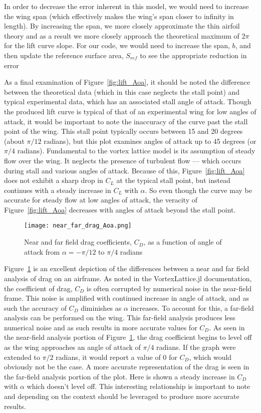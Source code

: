 \documentclass{article}
\begin{document}
In order to decrease the error inherent in this model, we would need to increase the wing span (which effectively makes the wing's span closer to infinity in length). By increasing the span, we more closely approximate the thin airfoil theory and as a result we more closely approach the theoretical maximum of $2\pi$ for the lift curve slope.
For our code, we would need to increase the span, $b$, and then update the reference surface area, $S_{ref}$ to see the appropriate reduction in error

As a final examination of Figure~\ref{fig:lift_Aoa}, it should be noted the difference between the theoretical data (which in this case neglects the stall point) and typical experimental data, which has an associated stall angle of attack.
Though the produced lift curve is typical of that of an experimental wing for low angles of attack, it would be important to note the inaccuracy of the curve past the stall point of the wing. This stall point typically occurs between 15 and 20 degrees (about $\pi/12$ radians), but this plot examines angles of attack up to 45 degrees (or $\pi/4$ radians).
Fundamental to the vortex lattice model is its assumption of steady flow over the wing. It neglects the presence of turbulent flow --- which occurs during stall and various angles of attack. 
Because of this, Figure~\ref{fig:lift_Aoa} does not exhibit a sharp drop in $C_L$ at the typical stall point, but instead continues with a steady increase in $C_L$ with $\alpha$. So even though the curve may be accurate for steady flow at low angles of attack, the veracity of Figure~\ref{fig:lift_Aoa} decreases with angles of attack beyond the stall point.
\begin{figure}[H]
    \centering
    \texttt{[image: near\_far\_drag\_Aoa.png]}
    \caption{Near and far field drag coefficients, $C_D$, as a function of angle of attack from $\alpha = -\pi/12$ to $\pi/4$ radians}\label{fig:near_far_drag_Aoa}
\end{figure}

Figure~\ref{fig:near_far_drag_Aoa} is an excellent depiction of the differences between a near and far field analysis of drag on an airframe. As noted in the VortexLattice.jl documentation,
the coefficient of drag, $C_D$ is often corrupted by numerical noise in the near-field frame. This noise is amplified with continued increase in angle of attack, and as such the accuracy of $C_D$ diminishes as $\alpha$ increases.
To account for this, a far-field analysis can be performed on the wing. This far-field analysis produces less numerical noise and as such results in more accurate values for $C_D$. As seen in the near-field analysis portion of Figure~\ref{fig:near_far_drag_Aoa},
the drag coefficient begins to level off as the wing approaches an angle of attack of $\pi/4$ radians. If the graph were extended to $\pi/2$ radians, it would report a value of 0 for $C_D$, which would obviously not be the case. A more accurate representation of the
drag is seen in the far-field analysis portion of the plot. Here is shown a steady increase in $C_D$ with $\alpha$ which doesn't level off. This interesting relationship is important to note and depending on the context should be leveraged to produce more accurate results.
\end{document}
